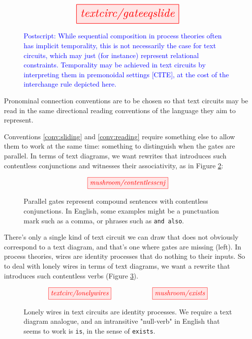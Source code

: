 \begin{figure}[h!]\label{fig:sliding}
\centering
\[
\resizebox{0.5\textwidth}{!}{\tikzfig{textcirc/gateeqslide}} 
\]
\caption{
\textcolor{blue}{Postscript: While sequential composition in process theories often has implicit temporality, this is not necessarily the case for text circuits, which may just (for instance) represent relational constraints. Temporality may be achieved in text circuits by interpreting them in premonoidal settings [CITE], at the cost of the interchange rule depicted here.}
}
\end{figure}

\begin{convention}\label{conv:reading}
Pronominal connection conventions are to be chosen so that text circuits may be read in the same directional reading conventions of the language they aim to represent.
\end{convention}

\begin{convention}\label{conv:and}
Conventions \ref{conv:sliding} and \ref{conv:reading} require something else to allow them to work at the same time: something to distinguish when the gates are parallel. In terms of text diagrams, we want rewrites that introduces such contentless conjunctions and witnesses their associativity, as in Figure \ref{fig:contentlessCNJ}:
\end{convention}

\begin{figure}[h!]\label{fig:contentlessCNJ}
\centering
\[
\tikzfig{mushroom/contentlesscnj}
\]
\caption{
Parallel gates represent compound sentences with contentless conjunctions. In English, some examples might be a punctuation mark such as a comma, or phrases such as \texttt{and also}.
}
\end{figure}

\begin{convention}\label{conv:exists}
There's only a single kind of text circuit we can draw that does not obviously correspond to a text diagram, and that's one where gates are missing (left). In process theories, wires are identity processes that do nothing to their inputs. So to deal with lonely wires in terms of text diagrams, we want a rewrite that introduces such contentless verbs (Figure \ref{fig:exists}).
\end{convention}

\begin{figure}[h!]\label{fig:exists}
\centering
\[
\tikzfig{textcirc/lonelywires} 
\qquad\qquad\qquad
\tikzfig{mushroom/exists} 
\]
\caption{
Lonely wires in text circuits are identity processes. We require a text diagram analogue, and an intransitive "null-verb" in English that seems to work is \texttt{is}, in the sense of \texttt{exists}.
}
\end{figure}

